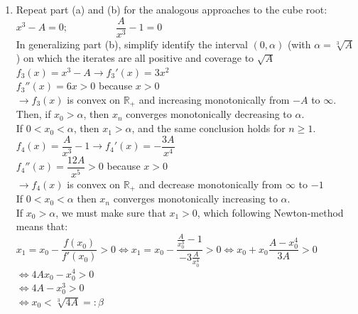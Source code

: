 \documentclass[14pt,a4paper]{article}
\begin{document}
\begin{enumerate}
	\label{3c}
	\item Repeat part (a) and (b) for the analogous approaches to the cube root:\\
	\hspace*{3cm} $x^3 - A = 0; \hspace{2cm} \dfrac{A}{x^3} - 1 = 0$\\
	In generalizing part (b), simplify identify the interval $(0,\alpha)$ (with $\alpha = \sqrt[3]{A}$) on which the iterates are all positive and coverage to $\sqrt{A}$\\
	\hspace*{2cm}	$f_3(x) = x^3 - A \rightarrow f_3'(x) = 3x^2$\\
	\hspace*{5.3cm}	$f_3''(x) = 6x > 0 $ because $ x > 0$\\
	$\rightarrow f_3(x)$ is convex on $\mathbb{R}_+$ and increasing monotonically from $-A$ to $\infty$.\\
	Then, if $x_0 > \alpha$, then $x_n$ converges monotonically decreasing to $\alpha$. \\
	If $0 < x_0 < \alpha$, then $x_1 > \alpha$, and the same conclusion holds for $n \geq 1$.\\
		
	\hspace*{2cm}	$f_4(x) = \dfrac{A}{x^3} - 1 \rightarrow f_4'(x) = -\dfrac{3A}{x^4}$\\
	\hspace*{5.3cm}	$f_4''(x) = \dfrac{12A}{x^5} > 0$ because $x > 0$\\
	$\rightarrow f_4(x)$ is convex on $\mathbb{R}_+$ and decrease monotonically from $\infty$ to $-1$\\
	If $0 < x_0 < \alpha$ then $x_n$ converges monotonically increasing to $\alpha$.\\
	If $x_0 > \alpha$, we must make sure that $x_1 > 0$, which following Newton-method means that: \\
	$ x_1 = x_0 - \dfrac{f(x_0)}{f'(x_0)} > 0 \Leftrightarrow x_1 = x_0 - \dfrac{\frac{A}{x_0^3} -1}{-3\frac{A}{x_0^4}} > 0 \Leftrightarrow x_0 + x_0\dfrac{A - x_0^4}{3A} > 0 $\\
	\hspace*{8.3cm} $\Leftrightarrow 4Ax_0 - x_0^4 > 0 $\\
	\hspace*{8.3cm} $\Leftrightarrow 4A - x_0^3 > 0 $\\
	\hspace*{8.3cm} $\Leftrightarrow x_0 < \sqrt[3]{4A} =: \beta$\\
	

\end{enumerate}
\end{document}
